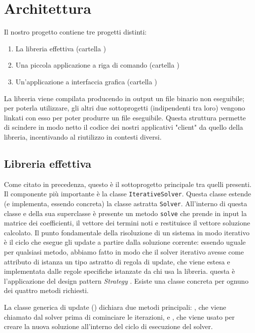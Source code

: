 \section{Architettura}

Il nostro progetto contiene tre progetti distinti:

\begin{enumerate}
	\item La libreria effettiva (cartella )
	\item Una piccola applicazione a riga di comando (cartella )
	\item Un'applicazione a interfaccia grafica (cartella )
\end{enumerate}

La libreria viene compilata producendo in output un file binario non eseguibile; per poterla utilizzare, gli altri due sottoprogetti (indipendenti tra loro) vengono linkati con esso per poter produrre un file eseguibile. Questa struttura permette di scindere in modo netto il codice dei nostri applicativi "client" da quello della libreria, incentivando al riutilizzo in contesti diversi.

\subsection{Libreria effettiva}
Come citato in precedenza, questo è il sottoprogetto principale tra quelli presenti. Il componente più importante è la classe \texttt{IterativeSolver}. Questa classe estende (e implementa, essendo concreta) la classe astratta \texttt{Solver}. All'interno di questa classe e della sua superclasse  è presente un metodo \texttt{solve} che prende in input la matrice dei coefficienti, il vettore dei termini noti e restituisce il vettore soluzione calcolato. Il punto fondamentale della risoluzione di un sistema in modo iterativo è il ciclo che esegue gli update a partire dalla soluzione corrente: essendo uguale per qualsiasi metodo, abbiamo fatto in modo che il solver iterativo avesse come attributo di istanza un tipo astratto di regola di update, che viene estesa e implementata dalle regole specifiche istanzate da chi usa la libreria. questa è l'applicazione del design pattern \textit{Strategy} \cite{Strategy}. Esiste una classe concreta per ognuno dei quattro metodi richiesti.

La classe generica di update () dichiara due metodi principali: , che viene chiamato dal solver prima di cominciare le iterazioni, e , che viene usato per creare la nuova soluzione all'interno del ciclo di esecuzione del solver.

